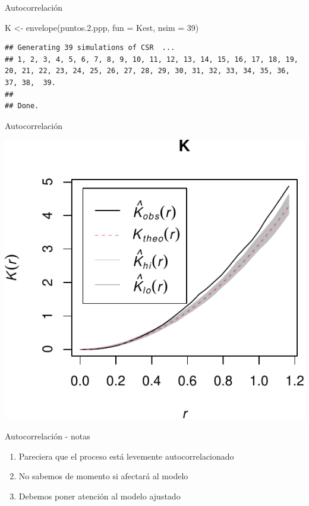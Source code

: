\documentclass[
  11pt,
  ignorenonframetext,
]{beamer}
\newenvironment{Shaded}{}{}
\newcommand{\AttributeTok}[1]{\textcolor[rgb]{0.49,0.56,0.16}{#1}}
\newcommand{\DecValTok}[1]{\textcolor[rgb]{0.25,0.63,0.44}{#1}}
\newcommand{\FloatTok}[1]{\textcolor[rgb]{0.25,0.63,0.44}{#1}}
\newcommand{\FunctionTok}[1]{\textcolor[rgb]{0.02,0.16,0.49}{#1}}
\newcommand{\NormalTok}[1]{#1}
\newcommand{\OtherTok}[1]{\textcolor[rgb]{0.00,0.44,0.13}{#1}}
\providecommand{\tightlist}{%
  \setlength{\itemsep}{0pt}\setlength{\parskip}{0pt}}
\begin{document}
\begin{frame}[fragile]{Autocorrelación}
\protect\hypertarget{autocorrelaciuxf3n}{}
\begin{Shaded}
\begin{Highlighting}[]
\NormalTok{K }\OtherTok{\textless{}{-}} \FunctionTok{envelope}\NormalTok{(puntos.}\FloatTok{2.}\NormalTok{ppp, }\AttributeTok{fun =}\NormalTok{ Kest, }\AttributeTok{nsim =} \DecValTok{39}\NormalTok{)}
\end{Highlighting}
\end{Shaded}

\begin{verbatim}
## Generating 39 simulations of CSR  ...
## 1, 2, 3, 4, 5, 6, 7, 8, 9, 10, 11, 12, 13, 14, 15, 16, 17, 18, 19, 20, 21, 22, 23, 24, 25, 26, 27, 28, 29, 30, 31, 32, 33, 34, 35, 36, 37, 38,  39.
## 
## Done.
\end{verbatim}
\end{frame}

\begin{frame}{Autocorrelación}
\protect\hypertarget{autocorrelaciuxf3n-1}{}
\begin{center}\includegraphics{Tutorial-spatstat-2_files/figure-beamer/unnamed-chunk-10-1} \end{center}
\end{frame}

\begin{frame}{Autocorrelación - notas}
\protect\hypertarget{autocorrelaciuxf3n---notas}{}
\begin{enumerate}
\tightlist
\item
  Pareciera que el proceso está levemente autocorrelacionado
\item
  No sabemos de momento si afectará al modelo
\item
  Debemos poner atención al modelo ajustado
\end{enumerate}
\end{frame}
\end{document}
